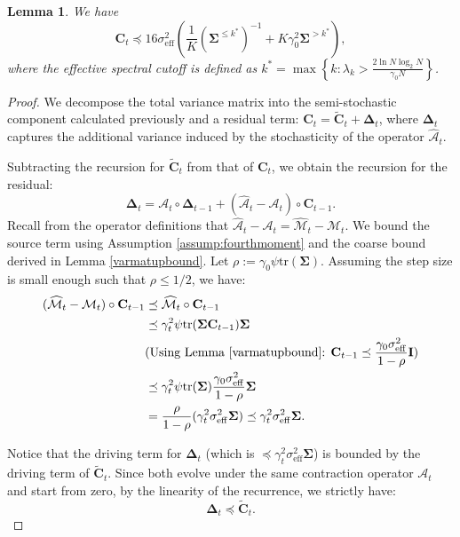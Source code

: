 \documentclass{article}
\theoremstyle{definition}
\theoremstyle{definition}
\theoremstyle{plain}
\theoremstyle{plain}
\theoremstyle{plain}
\newtheorem{lemma}{Lemma}
\theoremstyle{plain}
\theoremstyle{plain}
\newcommand{\bs}[1]{\boldsymbol{\mathbf{#1}}}
\newcommand{\mc}[1]{{\mathcal{#1}}}
\newcommand{\tr}{\mathrm{tr}}
\newcommand{\eff}{\mathrm{eff}}
\newcommand{\Sig}{\mathbf{\Sigma}}
\newcommand{\id}{\mathbf{I}}
\begin{document}
\begin{lemma}
We have
\begin{equation}
    {\bs C}_t\preceq 16{\sigma}_\eff^2\left( \frac{1}{K}(\Sig^{\leq k^*})^{-1}  +K\gamma_0^2 \Sig^{>k^*} \right),
\end{equation}
 where the effective spectral cutoff is defined as $k^* = \max\left\{k:\lambda_{k}> \frac{2\ln N\log_2 N}{\gamma_0 N} \right\}$.
\end{lemma}

\begin{proof}
    We decompose the total variance matrix into the semi-stochastic component calculated previously and a residual term: $\bs C_t = \tilde{\bs C}_t + \bs \Delta_t$, where $\bs \Delta_t$ captures the additional variance induced by the stochasticity of the operator $\widehat{\mc A}_t$.

    Subtracting the recursion for $\tilde{\bs C}_t$ from that of $\bs C_t$, we obtain the recursion for the residual:
    \begin{equation}
        \bs \Delta_t = \mc A_t \circ \bs \Delta_{t-1} + (\widehat{\mc A}_t - \mc A_t) \circ \bs C_{t-1}.
    \end{equation}
    Recall from the operator definitions that $\widehat{\mc A}_t - \mc A_t = \widehat{\mc M}_t - \mc M_t$. We bound the source term using Assumption \ref{assump:fourthmoment} and the coarse bound derived in Lemma \ref{varmatupbound}. Let $\rho := \gamma_0 \psi \tr(\bs\Sigma)$. Assuming the step size is small enough such that $\rho \le 1/2$, we have:
    \begin{equation}
    \begin{aligned}
        (\widehat{\mc M}_t - \mc M_t) \circ \bs C_{t-1} &\preceq \widehat{\mc M}_t \circ \bs C_{t-1} \\
        &\preceq \gamma_t^2 \psi \tr(\bs \Sigma \bs C_{t-1}) \bs \Sigma \\
        &\text{(Using Lemma \ref{varmatupbound}: } \bs C_{t-1} \preceq \frac{\gamma_0 \sigma_\eff^2}{1-\rho} \id \text{)} \\
        &\preceq \gamma_t^2 \psi \tr(\bs \Sigma) \frac{\gamma_0 \sigma_\eff^2}{1-\rho} \bs \Sigma \\
        &= \frac{\rho}{1-\rho} (\gamma_t^2 \sigma_\eff^2 \bs \Sigma) \preceq \gamma_t^2 \sigma_\eff^2 \bs \Sigma.
    \end{aligned}
    \end{equation}

    Notice that the driving term for $\bs \Delta_t$ (which is $\preceq \gamma_t^2 \sigma_\eff^2 \bs \Sigma$) is bounded by the driving term of $\tilde{\bs C}_t$. Since both evolve under the same contraction operator $\mc A_t$ and start from zero, by the linearity of the recurrence, we strictly have:
    \begin{equation}
        \bs \Delta_t \preceq \tilde{\bs C}_t.
    \end{equation}


\end{proof}
\end{document}
